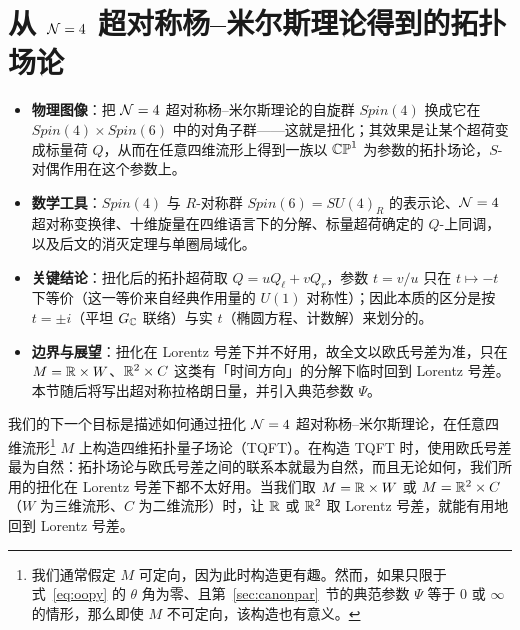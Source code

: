 
\section{从 ${\EUN}=4$ 超对称杨--米尔斯理论得到的拓扑场论} \label{sec:tqftfour}

\begin{keytakeaways}
\begin{itemize}[leftmargin=1.4em,itemsep=2pt,topsep=2pt]
\item \textbf{物理图像}：把 ${\EUN}=4$ 超对称杨--米尔斯理论的自旋群 $Spin(4)$ 换成它在 $Spin(4)\times Spin(6)$ 中的对角子群——这就是扭化；其效果是让某个超荷变成标量荷 $Q$，从而在任意四维流形上得到一族以 $\Bbb{CP}^1$ 为参数的拓扑场论，$S$-对偶作用在这个参数上。
\item \textbf{数学工具}：$Spin(4)$ 与 $R$-对称群 $Spin(6)=SU(4)_R$ 的表示论、${\EUN}=4$ 超对称变换律、十维旋量在四维语言下的分解、标量超荷确定的 $Q$-上同调，以及后文的消灭定理与单圈局域化。
\item \textbf{关键结论}：扭化后的拓扑超荷取 $Q=uQ_\ell+vQ_r$，参数 $t=v/u$ 只在 $t\mapsto-t$ 下等价（这一等价来自经典作用量的 $U(1)$ 对称性）；因此本质的区分是按 $t=\pm i$（平坦 $G_{\Bbb{C}}$ 联络）与实 $t$（椭圆方程、计数解）来划分的。
\item \textbf{边界与展望}：扭化在 Lorentz 号差下并不好用，故全文以欧氏号差为准，只在 $M=\Bbb{R}\times W$、$\Bbb{R}^2\times C$ 这类有「时间方向」的分解下临时回到 Lorentz 号差。本节随后将写出超对称拉格朗日量，并引入典范参数 $\Psi$。
\end{itemize}
\end{keytakeaways}

我们的下一个目标是描述如何通过扭化 ${\EUN}=4$ 超对称杨--米尔斯理论，在任意四维流形\footnote{我们通常假定 $M$ 可定向，因为此时构造更有趣。然而，如果只限于式~\eqref{eq:oopy} 的 $\theta$ 角为零、且第~\ref{sec:canonpar}~节的典范参数 $\Psi$ 等于 $0$ 或 $\infty$ 的情形，那么即使 $M$ 不可定向，该构造也有意义。} $M$ 上构造四维拓扑量子场论（TQFT）。在构造 TQFT 时，使用欧氏号差最为自然：拓扑场论与欧氏号差之间的联系本就最为自然，而且无论如何，我们所用的扭化在 Lorentz 号差下都不太好用。当我们取 $M=\Bbb{R}\times W$ 或 $M=\Bbb{R}^2\times C$（$W$ 为三维流形、$C$ 为二维流形）时，让 $\Bbb{R}$ 或 $\Bbb{R}^2$ 取 Lorentz 号差，就能有用地回到 Lorentz 号差。

